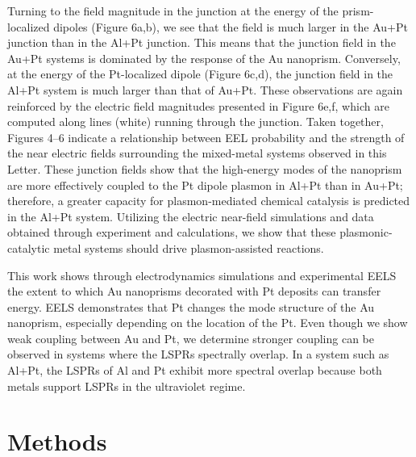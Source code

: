 \documentclass [11pt, proquest] {uwthesis}[2016/11/22]
\begin{document}
Turning to the field magnitude in the junction at the energy of the prism-localized dipoles (Figure 6a,b), we see that the field is much larger in the Au+Pt junction than in the Al+Pt junction. This means that the junction field in the Au+Pt systems is dominated by the response of the Au nanoprism. Conversely, at the energy of the Pt-localized dipole (Figure 6c,d), the junction field in the Al+Pt system is much larger than that of Au+Pt. These observations are again reinforced by the electric field magnitudes presented in Figure 6e,f, which are computed along lines (white) running through the junction. Taken together, Figures 4–6 indicate a relationship between EEL probability and the strength of the near electric fields surrounding the mixed-metal systems observed in this Letter. These junction fields show that the high-energy modes of the nanoprism are more effectively coupled to the Pt dipole plasmon in Al+Pt than in Au+Pt; therefore, a greater capacity for plasmon-mediated chemical catalysis is predicted in the Al+Pt system. Utilizing the electric near-field simulations and data obtained through experiment and calculations, we show that these plasmonic-catalytic metal systems should drive plasmon-assisted reactions.

This work shows through electrodynamics simulations and experimental EELS the extent to which Au nanoprisms decorated with Pt deposits can transfer energy. EELS demonstrates that Pt changes the mode structure of the Au nanoprism, especially depending on the location of the Pt. Even though we show weak coupling between Au and Pt, we determine stronger coupling can be observed in systems where the LSPRs spectrally overlap. In a system such as Al+Pt, the LSPRs of Al and Pt exhibit more spectral overlap because both metals support LSPRs in the ultraviolet regime.

\section{Methods}
\end{document}
